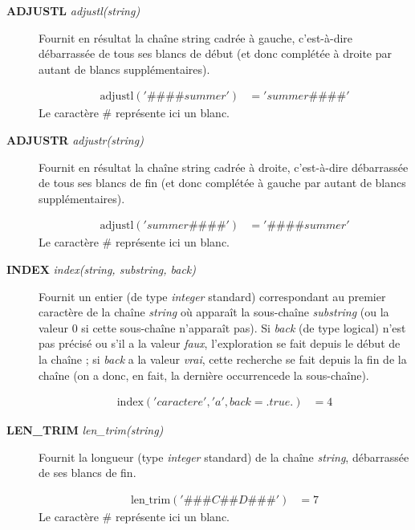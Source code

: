 \documentclass[a4paper,twoside]{article}
\begin{document}
\begin{description}
\item[\textbf{ADJUSTL} \emph{adjustl(string)}] Fournit en résultat la chaîne string \og cadrée à gauche\fg, c'est-à-dire débar\-rassée de tous ses blancs de début (et donc complétée à droite par autant de blancs supplémentaires). 
\begin{exemple}
\begin{align}
\mathrm{adjustl}('\#\#\#\#summer')  &= 'summer\#\#\#\#'
\end{align}
Le caractère \# représente ici 
un blanc.
\end{exemple} 

\item[\textbf{ADJUSTR} \emph{adjustr(string)}] Fournit en résultat la chaîne string \og cadrée à droite\fg, c'est-à-dire débarrassée de tous ses blancs de fin (et donc complétée à gauche par autant de blancs supplémentaires). 
\begin{exemple}
\begin{align}
\mathrm{adjustl}('summer\#\#\#\#')  &= '\#\#\#\#summer'
\end{align}
Le caractère \# représente ici un blanc.
\end{exemple}

\item[\textbf{INDEX} \emph{index(string, substring, back)}] Fournit un entier (de type \emph{integer} standard) correspondant au premier caractère de la chaîne \emph{string} où apparaît la sous-chaîne \emph{substring} (ou la valeur 0 si cette sous-chaîne n'apparaît pas). Si \emph{back}  (de type logical) n'est pas précisé ou s'il a la valeur \emph{faux}, l'exploration se fait depuis le début de la chaîne ; si \emph{back} a la valeur \emph{vrai}, cette recherche se fait depuis la fin de la chaîne (on a donc, en fait, la dernière \og occurrence\fg de la sous-chaîne). 
\begin{exemple}
\begin{align}
\mathrm{index}('caractere','a',back=.true.)  &= 4
\end{align}
\end{exemple}

\item[\textbf{LEN\_TRIM} \emph{len\_trim(string)}] Fournit la longueur (type \emph{integer} standard) de la chaîne \emph{string}, débar\-rassée de ses blancs de fin. 
\begin{exemple}
\begin{align}
\mathrm{len\_trim}('\#\#\#C\#\#D\#\#\#')  &= 7
\end{align}
Le caractère \# représente ici un blanc.
\end{exemple}


\end{description}
\end{document}
